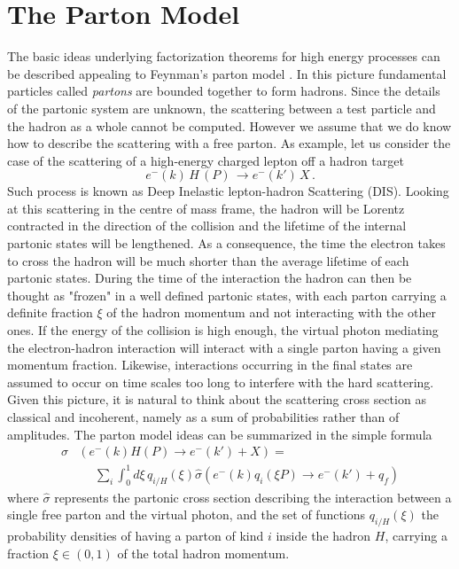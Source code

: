 \section{The Parton Model}
The basic ideas underlying factorization theorems for high energy processes can 
be described appealing to Feynman's parton model \cite{PhysRevLett.23.1415,Feynman:1973xc, Bjorken:1969ja}.
In this picture fundamental particles called \textit{partons} are bounded together to form hadrons.
Since the details of the partonic system are unknown, the scattering between a test particle and the hadron 
as a whole cannot be computed. However we assume that we do know how to describe the scattering with a free parton.
%
As example, let us consider the case of the scattering of a high-energy charged lepton off a
hadron target 
$$e^{-}(k)\,H\,(P)\,\rightarrow e^{-}(k')\,X \,. $$ 
Such process is known as Deep Inelastic lepton-hadron Scattering (DIS).
Looking at this scattering in the centre of mass frame, the hadron will be Lorentz contracted 
in the direction of the collision and the lifetime of the internal partonic states will be lengthened.
As a consequence, the time the electron takes to cross the hadron will be much shorter than the average lifetime of
each partonic states. During the time of the interaction the hadron can then be thought as "frozen" in 
a well defined partonic states, with each parton carrying a definite fraction $\xi$ of the hadron momentum
and not interacting with the other ones. 
If the energy of the collision is high enough, the virtual photon mediating the electron-hadron 
interaction will interact with a single parton having a given momentum fraction. Likewise, interactions
occurring in the final states are assumed to occur on time scales too long to interfere with the hard scattering.
%
Given this picture, it is natural to think about the scattering cross section as classical and incoherent,
namely as a sum of probabilities rather than of amplitudes. The parton model ideas can be summarized in the simple formula
\begin{align}
    \label{eq:parton_model}
    \sigma&\left(e^{-}\left(k\right)H\left(P\right)\rightarrow e^{-}\left(k'\right)+X\right) = \nonumber\\
     &\,\,\,\,\,\,\,\,\sum_i\int_0^1 d\xi\, q_{i/H}\left(\xi\right)
     \hat{\sigma}\left(e^{-}\left(k\right)q_i\left(\xi P\right)\rightarrow e^{-}\left(k'\right)+q_f\right)
\end{align}
where $\hat{\sigma}$ represents the partonic cross section describing the interaction between 
a single free parton and the virtual photon, and the set of functions $q_{i/H}\left(\xi\right)$ the probability densities
of having a parton of kind $i$ inside the hadron $H$, carrying a fraction $\xi \in \left(0,1\right)$ of the total hadron momentum.

